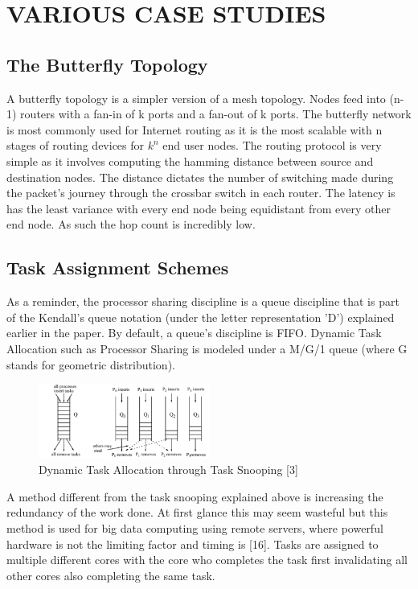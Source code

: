 \documentclass[letterpaper, 10 pt, conference]{ieeeconf}
\begin{document}
\section{VARIOUS CASE STUDIES}
\subsection{The Butterfly Topology}

A butterfly topology is a simpler version of a mesh topology.  Nodes feed into (n-1) routers with a fan-in of k ports and a fan-out of k ports.  The butterfly network is most commonly used for Internet routing as it is the most scalable with n stages of routing devices for $k^{n}$ end user nodes.  The routing protocol is very simple as it involves computing the hamming distance between source and destination nodes.  The distance dictates the number of switching made during the packet's journey through the crossbar switch in each router.  The latency is has the least variance with every end node being equidistant from every other end node.  As such the hop count is incredibly low. %

\subsection{Task Assignment Schemes}

As a reminder, the processor sharing discipline is a queue discipline that is part of the Kendall's queue notation (under the letter representation 'D') explained earlier in the paper.  By default, a queue's discipline is FIFO.  Dynamic Task Allocation such as Processor Sharing is modeled under a M/G/1 queue (where G stands for geometric distribution).

\begin{figure}[!ht] %
	\centering
	\includegraphics [width=0.5\textwidth] {Task_Snooping.png} 
    \caption{Dynamic Task Allocation through Task Snooping [3]}
\end{figure}

A method different from the task snooping explained above is increasing the redundancy of the work done.  At first glance this may seem wasteful but this method is used for big data computing using remote servers, where powerful hardware is not the limiting factor and timing is [16].  Tasks are assigned to multiple different cores with the core who completes the task first invalidating all other cores also completing the same task.  
\end{document}
